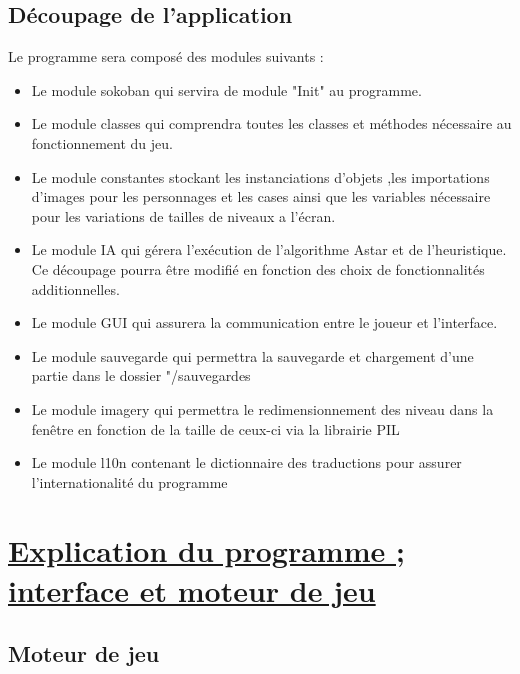 \documentclass{article}
\begin{document}
		\subsection{Découpage de l'application}
		\vspace{1cm}
	Le programme sera composé des modules suivants :
		\begin{itemize}
\item Le module sokoban qui servira de module "Init" au programme.
\item Le module classes qui comprendra toutes les classes et méthodes nécessaire
au fonctionnement du jeu.
\item Le module constantes stockant les instanciations d'objets ,les importations d’images pour les personnages
et les cases ainsi que les variables nécessaire pour les variations
de tailles de niveaux a l’écran.
\item Le module IA qui gérera l'exécution de l'algorithme Astar et de l'heuristique.
Ce découpage pourra être modifié en fonction des choix de fonctionnalités additionnelles.
\item Le module GUI qui assurera la communication entre le joueur et l'interface.
\item Le module sauvegarde qui permettra la sauvegarde et chargement d'une partie dans le dossier "/sauvegardes
\item Le module imagery qui permettra le redimensionnement des niveau dans la fenêtre en fonction de la taille de ceux-ci via la librairie PIL
\item Le module l10n contenant le dictionnaire des traductions pour assurer l'internationalité du programme
		\end{itemize}

\newpage

\section{\underline{Explication du programme ; interface et  moteur de jeu}}


\vspace{1.5 cm}
\subsection{Moteur de jeu}
\end{document}
